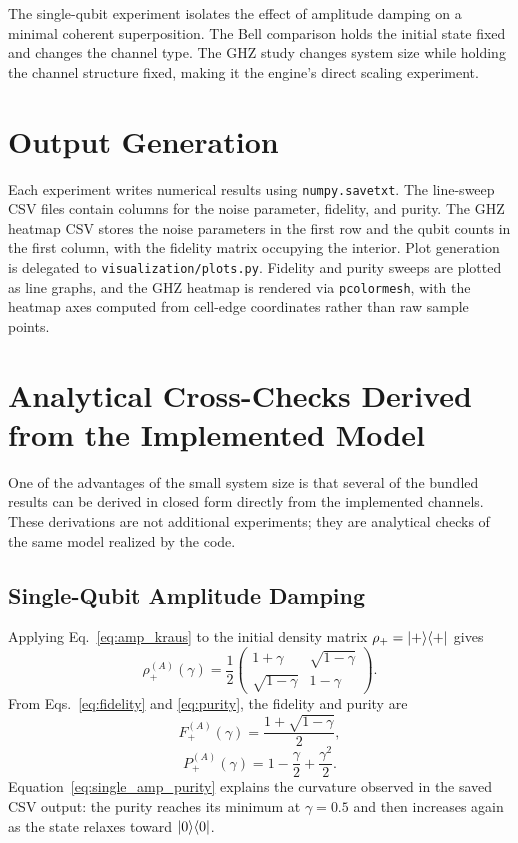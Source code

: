 The single-qubit experiment isolates the effect of amplitude damping on a minimal coherent superposition. The Bell comparison holds the initial state fixed and changes the channel type. The GHZ study changes system size while holding the channel structure fixed, making it the engine's direct scaling experiment.

\section{Output Generation}

Each experiment writes numerical results using \texttt{numpy.savetxt}. The line-sweep CSV files contain columns for the noise parameter, fidelity, and purity. The GHZ heatmap CSV stores the noise parameters in the first row and the qubit counts in the first column, with the fidelity matrix occupying the interior. Plot generation is delegated to \texttt{visualization/plots.py}. Fidelity and purity sweeps are plotted as line graphs, and the GHZ heatmap is rendered via \texttt{pcolormesh}, with the heatmap axes computed from cell-edge coordinates rather than raw sample points.

\section{Analytical Cross-Checks Derived from the Implemented Model}

One of the advantages of the small system size is that several of the bundled results can be derived in closed form directly from the implemented channels. These derivations are not additional experiments; they are analytical checks of the same model realized by the code.

\subsection{Single-Qubit Amplitude Damping}

Applying Eq.~\eqref{eq:amp_kraus} to the initial density matrix $\rho_+ = \lvert + \rangle\langle + \rvert$ gives
\begin{equation}
\rho_+^{(A)}(\gamma)
=
\frac{1}{2}
\begin{pmatrix}
1+\gamma & \sqrt{1-\gamma} \\
\sqrt{1-\gamma} & 1-\gamma
\end{pmatrix}.
\label{eq:single_amp_exact}
\end{equation}
From Eqs.~\eqref{eq:fidelity} and \eqref{eq:purity}, the fidelity and purity are
\begin{equation}
F_+^{(A)}(\gamma) = \frac{1 + \sqrt{1-\gamma}}{2},
\label{eq:single_amp_fidelity}
\end{equation}
\begin{equation}
P_+^{(A)}(\gamma) = 1 - \frac{\gamma}{2} + \frac{\gamma^2}{2}.
\label{eq:single_amp_purity}
\end{equation}
Equation~\eqref{eq:single_amp_purity} explains the curvature observed in the saved CSV output: the purity reaches its minimum at $\gamma = 0.5$ and then increases again as the state relaxes toward $\lvert 0 \rangle\langle 0 \rvert$.

